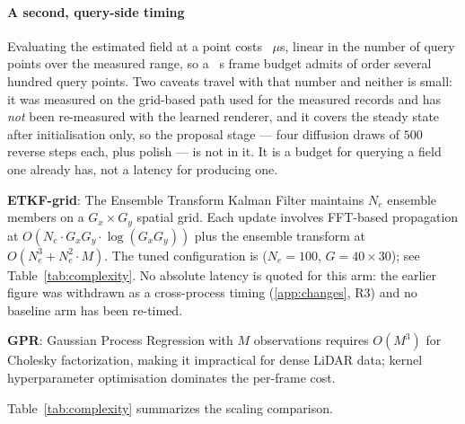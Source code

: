 \documentclass[review]{elsarticle}
\begin{document}
\paragraph{A second, query-side timing}
Evaluating the estimated field at a point costs \BudgetUsPerPoint{}~$\mu$s, linear
in the number of query points over the measured range, so a
\BudgetFrameS{}~s frame budget admits of order several hundred query points. Two
caveats travel with that number and neither is small: it was measured on the
grid-based path used for the measured records and has \emph{not} been re-measured
with the learned renderer, and it covers the steady state after initialisation
only, so the proposal stage --- four diffusion draws of $500$ reverse steps each,
plus polish --- is not in it. It is a budget for querying a field one already has,
not a latency for producing one.

\textbf{ETKF-grid}: The Ensemble Transform Kalman Filter maintains
$N_e$ ensemble members on a $G_x \times G_y$ spatial grid.
Each update involves FFT-based propagation at
$O(N_e \cdot G_x G_y \cdot \log(G_x G_y))$ plus the ensemble
transform at $O(N_e^3 + N_e^2 \cdot M)$. The tuned configuration is
($N_e{=}100$, $G{=}40 \times 30$); see Table~\ref{tab:complexity}.
No absolute latency is quoted for this arm: the earlier figure was withdrawn as a
cross-process timing (\ref{app:changes}, R3) and no baseline arm has been
re-timed.

\textbf{GPR}: Gaussian Process Regression with $M$ observations
requires $O(M^3)$ for Cholesky factorization, making it impractical
for dense LiDAR data; kernel hyperparameter optimisation dominates the per-frame
cost.

Table~\ref{tab:complexity} summarizes the scaling comparison.
\end{document}
